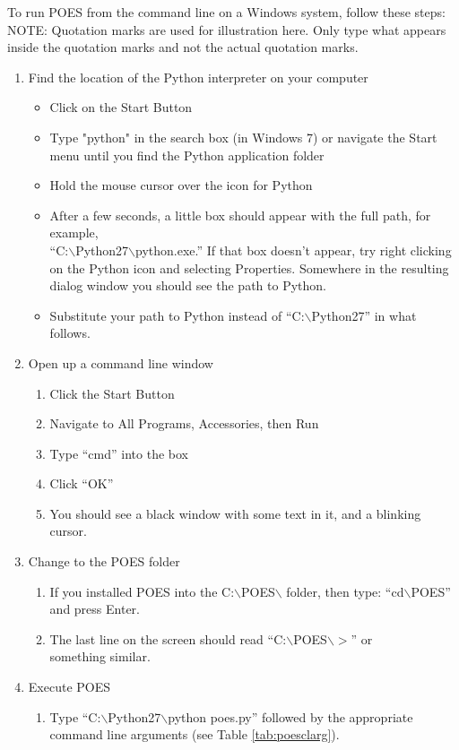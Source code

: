 \documentclass[11pt]{article}
\newcommand{\bsl}{$\backslash$}
\numberwithin{figure}{section}
\numberwithin{table}{section}
\begin{document}
To run POES from the command line on a Windows system, follow these steps:
NOTE: Quotation marks are used for illustration here.  Only type what appears inside the quotation marks and not the actual quotation marks.
\begin{enumerate}
\item Find the location of the Python interpreter on your computer
\begin{itemize}
\item Click on the Start Button
\item Type "python" in the search box (in Windows 7) or navigate the
Start menu until you find the Python application folder
\item Hold the mouse cursor over the icon for Python  
\item After a few seconds, a little box should appear with the full path, for example, \\``C:\bsl{}Python27\bsl{}python.exe.''  If that box doesn't appear, try right clicking on the Python icon and selecting Properties.  Somewhere in the resulting dialog window you should see the path to Python.
\item Substitute your path to Python instead of ``C:\bsl{}Python27'' in what follows.
\end{itemize}
\item Open up a command line window
\begin{enumerate}
\item Click the Start Button
\item Navigate to All Programs, Accessories, then Run
\item Type ``cmd'' into the box
\item Click ``OK''
\item You should see a black window with some text in it, and a blinking cursor.
\end{enumerate}
\item Change to the POES folder
\begin{enumerate}
\item If you installed POES into the C:\bsl{}POES\bsl{} folder, then type: ``cd\bsl{}POES'' and press Enter.
\item The last line on the screen should read ``C:\bsl{}POES\bsl{}$>$'' or \\something similar.
\end{enumerate}
\item Execute POES
\begin{enumerate}
\item Type ``C:\bsl{}Python27\bsl{}python poes.py'' followed by the appropriate command line arguments (see Table \ref{tab:poesclarg}).

\end{enumerate}
\end{enumerate}
\end{document}
